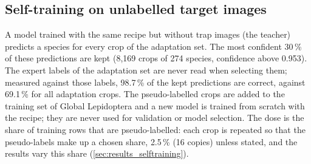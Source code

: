 \subsection{Self-training on unlabelled target images}\label{sec:selftraining}
A model trained with the same recipe but without trap images (the teacher) predicts a species for every crop of the adaptation set.
The most confident 30\,\% of these predictions are kept (8,169 crops of 274 species, confidence above 0.953).
The expert labels of the adaptation set are never read when selecting them; measured against those labels, 98.7\,\% of the kept predictions are correct, against 69.1\,\% for all adaptation crops.
The pseudo-labelled crops are added to the training set of Global Lepidoptera and a new model is trained from scratch with the recipe; they are never used for validation or model selection.
The dose is the share of training rows that are pseudo-labelled: each crop is repeated so that the pseudo-labels make up a chosen share, 2.5\,\% (16 copies) unless stated, and the results vary this share (\cref{sec:results_selftraining}).
